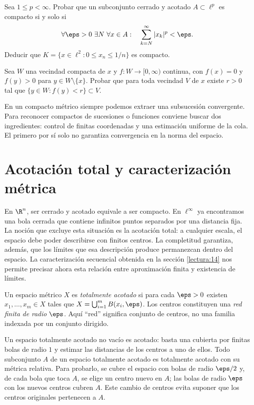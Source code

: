 \begin{ejercicio}\label{ej:lectura-14-5}
Sea $1\le p<\infty$. Probar que un subconjunto cerrado y acotado $A\subset\ell^p$ es compacto si y solo si
\[
\forall\eps>0\ \exists N\ \forall x\in A:\quad
\sum_{k=N}^\infty |x_k|^p<\eps.
\]
Deducir que $K=\{x\in\ell^2:0\le x_n\le1/n\}$ es compacto.
\end{ejercicio}


\begin{ejercicio}\label{ej:lectura-14-6}
Sea $W$ una vecindad compacta de $x$ y $f:W\to[0,\infty)$ continua, con $f(x)=0$ y $f(y)>0$ para $y\in W\setminus\{x\}$. Probar que para toda vecindad $V$ de $x$ existe $r>0$ tal que $\{y\in W:f(y)<r\}\subset V$.
\end{ejercicio}


En un compacto métrico siempre podemos extraer una subsucesión convergente. Para reconocer compactos de sucesiones o funciones conviene buscar dos ingredientes: control de finitas coordenadas y una estimación uniforme de la cola. El primero por sí solo no garantiza convergencia en la norma del espacio.

\section{Acotación total y caracterización métrica}\label{lectura:15}
En $\R^n$, ser cerrado y acotado equivale a ser compacto. En $\ell^\infty$ ya encontramos una bola cerrada que contiene infinitos puntos separados por una distancia fija. La noción que excluye esta situación es la acotación total: a cualquier escala, el espacio debe poder describirse con finitos centros. La completitud garantiza, además, que los límites que esa descripción produce permanezcan dentro del espacio. La caracterización secuencial obtenida en la sección \ref{lectura:14} nos permite precisar ahora esta relación entre aproximación finita y existencia de límites.

\begin{definicion}
Un espacio métrico $X$ es \emph{totalmente acotado} si para cada $\eps>0$ existen $x_1,\ldots,x_m\in X$ tales que $X=\bigcup_{i=1}^mB(x_i,\eps)$. Los centros constituyen una \emph{red finita de radio $\eps$}. Aquí ``red'' significa conjunto de centros, no una familia indexada por un conjunto dirigido.
\end{definicion}
Un espacio totalmente acotado no vacío es acotado: basta una cubierta por finitas bolas de radio $1$ y estimar las distancias de los centros a uno de ellos. Todo subconjunto $A$ de un espacio totalmente acotado es totalmente acotado con su métrica relativa. Para probarlo, se cubre el espacio con bolas de radio $\eps/2$ y, de cada bola que toca $A$, se elige un centro nuevo en $A$; las bolas de radio $\eps$ con los nuevos centros cubren $A$. Este cambio de centros evita suponer que los centros originales pertenecen a $A$.

